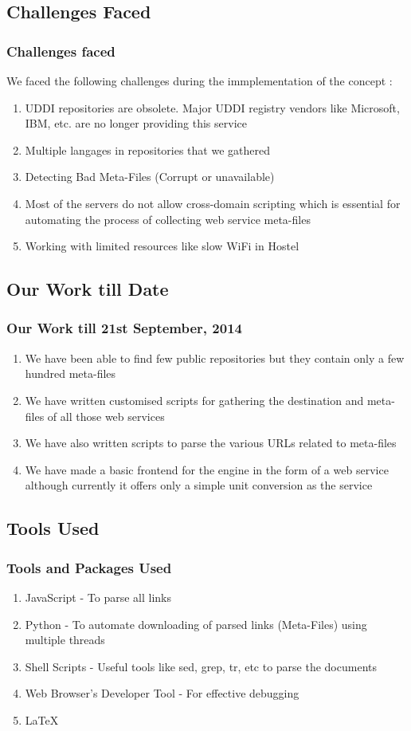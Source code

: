 \documentclass[12pt,xcolor=dvipsnames]{beamer}
\begin{document}
\subsection{Challenges Faced}
\begin{frame}
 \frametitle{Challenges faced}
 We faced the following challenges during the immplementation of the concept :
 \begin{enumerate}
  \item UDDI repositories are obsolete. Major UDDI registry vendors like Microsoft, IBM, etc. are no longer providing this service
  \item Multiple langages in repositories that we gathered
  \item Detecting Bad Meta-Files (Corrupt or unavailable)
  \item Most of the servers do not allow cross-domain scripting which is essential for automating the process of collecting web service meta-files
  \item Working with limited resources like slow WiFi in Hostel
 \end{enumerate}
\end{frame}


\subsection{Our Work till Date}
\begin{frame}
\frametitle{Our Work till 21st September, 2014}
 \begin{enumerate}
  \item We have been able to find few public repositories but they contain only a few hundred meta-files
  \item We have written customised scripts for gathering the destination and meta-files of all those web services
  \item We have also written scripts to parse the various URLs related to meta-files
  \item We have made a basic frontend for the engine in the form of a web service although currently it offers only a simple unit conversion as the service
 \end{enumerate}
\end{frame}

\subsection{Tools Used}
\begin{frame}
\frametitle{Tools and Packages Used}
 \begin{enumerate}
  \item JavaScript - To parse all links
  \item Python - To automate downloading of parsed links (Meta-Files) using multiple threads
  \item Shell Scripts - Useful tools like sed, grep, tr, etc to parse the documents
  \item Web Browser's Developer Tool - For effective debugging
  \item \LaTeX
 \end{enumerate}
\end{frame}
\end{document}
